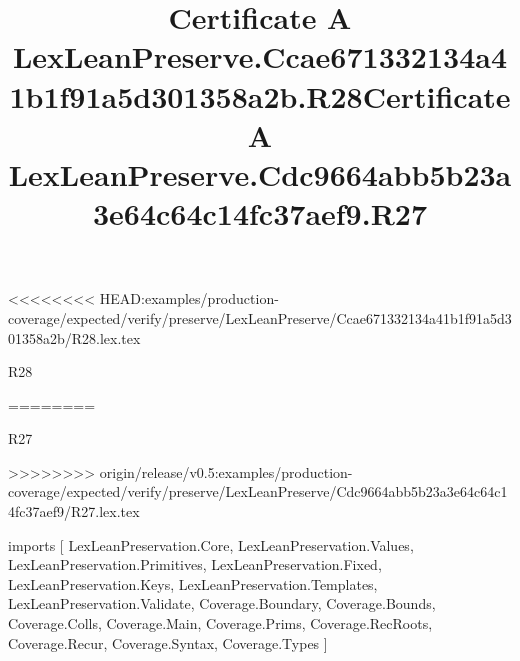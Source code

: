 <<<<<<<< HEAD:examples/production-coverage/expected/verify/preserve/LexLeanPreserve/Ccae671332134a41b1f91a5d301358a2b/R28.lex.tex
\begin{lexlean}{R28}
\title{Certificate A LexLeanPreserve.Ccae671332134a41b1f91a5d301358a2b.R28}
========
\begin{lexlean}{R27}
\title{Certificate A LexLeanPreserve.Cdc9664abb5b23a3e64c64c14fc37aef9.R27}
>>>>>>>> origin/release/v0.5:examples/production-coverage/expected/verify/preserve/LexLeanPreserve/Cdc9664abb5b23a3e64c64c14fc37aef9/R27.lex.tex
\begin{coremodule}
imports [
  LexLeanPreservation.Core,
  LexLeanPreservation.Values,
  LexLeanPreservation.Primitives,
  LexLeanPreservation.Fixed,
  LexLeanPreservation.Keys,
  LexLeanPreservation.Templates,
  LexLeanPreservation.Validate,
  Coverage.Boundary,
  Coverage.Bounds,
  Coverage.Colls,
  Coverage.Main,
  Coverage.Prims,
  Coverage.RecRoots,
  Coverage.Recur,
  Coverage.Syntax,
  Coverage.Types
]


\end{coremodule}
\end{lexlean}
\end{lexlean}
